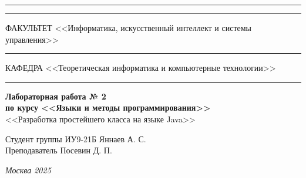 \documentclass[a4paper, 14pt]{extarticle}
\begin{document}
\begin{titlepage}
\vspace{-25pt}
\hspace{-35pt}\rule{\textwidth}{2.3pt}

\vspace*{-20.3pt}
\hspace{-35pt}\rule{\textwidth}{0.4pt}

\vspace{1.5ex}
\hspace{-35pt} \noindent \small ФАКУЛЬТЕТ\hspace{30pt} <<Информатика, искусственный интеллект и системы управления>>

\vspace*{-16pt}
\hspace{47pt}\rule{0.83\textwidth}{0.4pt}

\vspace{0.5ex}
\hspace{-35pt} \noindent \small КАФЕДРА\hspace{50pt} <<Теоретическая информатика и компьютерные технологии>>

\vspace*{-16pt}
\hspace{30pt}\rule{0.866\textwidth}{0.4pt}
  
\vspace{11em}

\begin{center}
\Large {\bf Лабораторная работа № 2} \\ 
\large {\bf по курсу <<Языки и методы программирования>>} \\
\large <<Разработка простейшего класса на языке Java>> 
\end{center}\normalsize

\vspace{8em}


\begin{flushright}
  {Студент группы ИУ9-21Б Яннаев А. С. \hspace*{15pt}\\ 
  \vspace{2ex}
  Преподаватель Посевин Д. П.\hspace*{15pt}}
\end{flushright}

\bigskip

\vfill
 

\begin{center}
\textsl{Москва 2025}
\end{center}
\end{titlepage}
\end{document}
